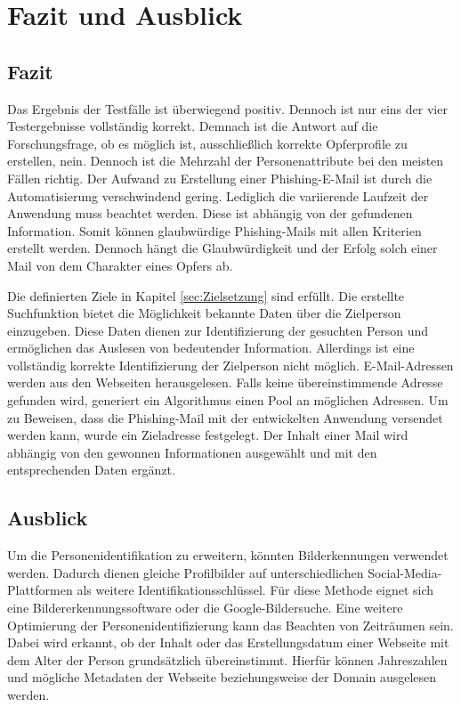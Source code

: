 \chapter{Fazit und Ausblick}
\label{chap:SchlussUndAusblick}
\section{Fazit}
Das Ergebnis der Testfälle ist überwiegend positiv. Dennoch ist nur eins der vier Testergebnisse vollständig korrekt. Demnach ist die Antwort auf die Forschungsfrage, ob es möglich ist, ausschließlich korrekte Opferprofile zu erstellen, nein. Dennoch ist die Mehrzahl der Personenattribute bei den meisten Fällen richtig. Der Aufwand zu Erstellung einer Phishing-E-Mail ist durch die Automatisierung verschwindend gering. Lediglich die variierende Laufzeit der Anwendung muss beachtet werden. Diese ist abhängig von der gefundenen Information. Somit können glaubwürdige Phishing-Mails mit allen Kriterien erstellt werden. Dennoch hängt die Glaubwürdigkeit und der Erfolg solch einer Mail von dem Charakter eines Opfers ab.

Die definierten Ziele in Kapitel \ref{sec:Zielsetzung} sind erfüllt. Die erstellte Suchfunktion bietet die Möglichkeit bekannte Daten über die Zielperson einzugeben. Diese Daten dienen zur Identifizierung der gesuchten Person und ermöglichen das Auslesen von bedeutender Information. Allerdings ist eine vollständig korrekte Identifizierung der Zielperson nicht möglich. E-Mail-Adressen werden aus den Webseiten herausgelesen. Falls keine übereinstimmende Adresse gefunden wird, generiert ein Algorithmus einen Pool an möglichen Adressen. Um zu Beweisen, dass die Phishing-Mail mit der entwickelten Anwendung versendet werden kann, wurde ein Zieladresse festgelegt. Der Inhalt einer Mail wird abhängig von den gewonnen Informationen ausgewählt und mit den entsprechenden Daten ergänzt.

\section{Ausblick}
Um die Personenidentifikation zu erweitern, könnten Bilderkennungen verwendet werden. Dadurch dienen gleiche Profilbilder auf unterschiedlichen Social-Media-Plattformen als weitere Identifikationsschlüssel. Für diese Methode eignet sich eine Bildererkennungssoftware oder die Google-Bildersuche. Eine weitere Optimierung der Personenidentifizierung kann das Beachten von Zeiträumen sein. Dabei wird erkannt, ob der Inhalt oder das Erstellungsdatum einer Webseite mit dem Alter der Person grundsätzlich übereinstimmt. Hierfür können Jahreszahlen und mögliche Metadaten der Webseite beziehungsweise der Domain ausgelesen werden.

